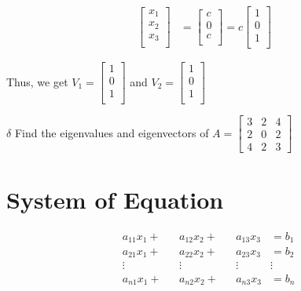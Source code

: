 \documentclass{article}
\begin{document}
\begin{align*}
    \begin{bmatrix}
        x_1 \\
        x_2 \\
        x_3 \\
    \end{bmatrix}
    &= \begin{bmatrix}
        c \\
        0 \\
        c \\
    \end{bmatrix}
    = c\begin{bmatrix}
        1 \\
        0 \\
        1 \\
    \end{bmatrix}
\end{align*}

Thus, we get \( V_1 = 
\begin{bmatrix}
    1 \\
    0 \\
    1 \\
\end{bmatrix} \)
and \( V_2 = \begin{bmatrix}
    1 \\ 
    0 \\ 
    1 \\
\end{bmatrix} \)

$\delta$ Find the eigenvalues and eigenvectors of \(A = \begin{bmatrix} 3 & 2 & 4 \\ 2 & 0 & 2 \\ 4 & 2 & 3 \end{bmatrix}\)
\newpage
\section*{System of Equation}

\begin{align*}
    &a_{11}x_1 + &&a_{12}x_2 + &&a_{13}x_3 &= b_1 \\
    &a_{21}x_1 + &&a_{22}x_2 + &&a_{23}x_3 &= b_2 \\
    &\vdots &&\vdots &&\vdots &\vdots \\
    &a_{n1}x_1 + &&a_{n2}x_2 + &&a_{n3}x_3 &= b_n
\end{align*}
\end{document}
